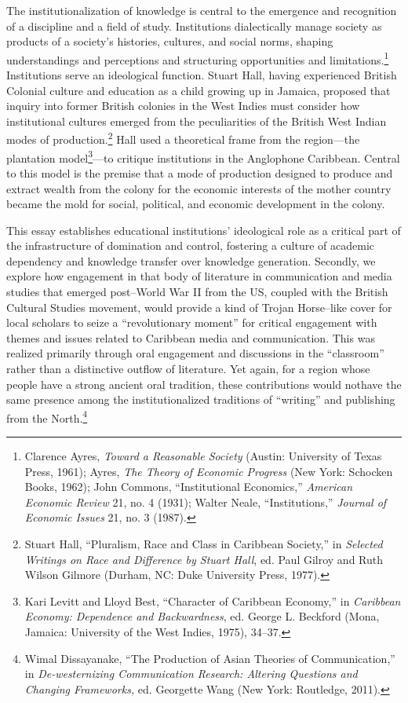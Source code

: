 \documentclass{tufte-handout}
\begin{document}
The institutionalization of knowledge is central to the emergence and
recognition of a discipline and a field of study. Institutions
dialectically manage society as products of a society's histories,
cultures, and social norms, shaping understandings and perceptions and
structuring opportunities and limitations.\footnote{Clarence Ayres,
  \emph{Toward a Reasonable Society} (Austin: University of Texas Press,
  1961); Ayres, \emph{The Theory of Economic Progress} (New York:
  Schocken Books, 1962); John Commons, ``Institutional Economics,''
  \emph{American Economic Review} 21, no. 4 (1931); Walter Neale,
  ``Institutions,'' \emph{Journal of Economic Issues} 21, no. 3 (1987).}
Institutions serve an ideological function. Stuart Hall, having experienced
British Colonial culture and education as a child growing up in Jamaica,
proposed that inquiry into former British colonies in the West Indies
must consider how institutional cultures emerged from the peculiarities
of the British West Indian modes of production.\footnote{Stuart Hall,
  ``Pluralism, Race and Class in Caribbean Society,'' in \emph{Selected
  Writings on Race and Difference by Stuart Hall}, ed. Paul Gilroy and
  Ruth Wilson Gilmore (Durham, NC: Duke University Press, 1977).} Hall
used a theoretical frame from the region---the plantation
model\footnote{Kari Levitt and Lloyd Best, ``Character of Caribbean
  Economy,'' in \emph{Caribbean Economy: Dependence and Backwardness},
  ed. George L. Beckford (Mona, Jamaica: University of the West Indies,
  1975), 34--37.}---to critique institutions in the Anglophone
Caribbean. Central to this model is the premise that a mode of
production designed to produce and extract wealth from the colony for
the economic interests of the mother country became the mold for social,
political, and economic development in the colony.

This essay establishes educational institutions' ideological role as a
critical part of the infrastructure of domination and control, fostering
a culture of academic dependency and knowledge transfer over knowledge
generation. Secondly, we explore how engagement in that body of
literature in communication and media studies that emerged post--World
War II from the US, coupled with the British Cultural Studies movement,
would provide a kind of Trojan Horse--like cover for local scholars to
seize a ``revolutionary moment'' for critical engagement with themes and
issues related to Caribbean media and communication. This was realized
primarily through oral engagement and discussions in the ``classroom''
rather than a distinctive outflow of literature. Yet again, for a region
whose people have a strong ancient oral tradition, these contributions
would not\newpage\noindent have the same presence among the institutionalized traditions
of ``writing'' and publishing from the North.\footnote{Wimal
  Dissayanake, ``The Production of Asian Theories of Communication,'' in
  \emph{De-westernizing Communication Research: Altering Questions and
  Changing Frameworks,} ed. Georgette Wang (New York: Routledge, 2011).}
\end{document}
